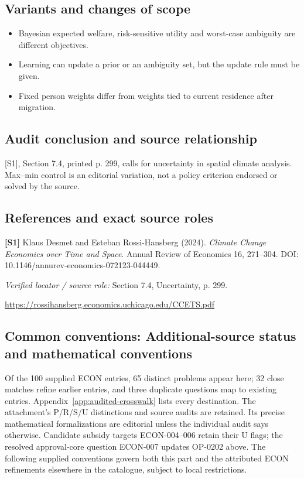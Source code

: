 \documentclass[11pt,a4paper]{article}
\begin{document}
\subsection*{Variants and changes of scope}

\begin{itemize}
\item Bayesian expected welfare, risk-sensitive utility and worst-case ambiguity are different objectives.
\item Learning can update a prior or an ambiguity set, but the update rule must be given.
\item Fixed person weights differ from weights tied to current residence after migration.
\end{itemize}

\subsection*{Audit conclusion and source relationship}

[S1], Section 7.4, printed p. 299, calls for uncertainty in spatial climate analysis. Max--min control is an editorial variation, not a policy criterion endorsed or solved by the source.

\subsection*{References and exact source roles}

{\footnotesize\raggedright
\par\noindent\textbf{[S1]} Klaus Desmet and Esteban Rossi-Hansberg (2024). \emph{Climate Change Economics over Time and Space}. Annual Review of Economics 16, 271–304. DOI: 10.1146/annurev-economics-072123-044449.\par \textit{Verified locator / source role:} Section 7.4, Uncertainty, p. 299.\par \url{https://rossihansberg.economics.uchicago.edu/CCETS.pdf}\par\smallskip
}

\subsection*{Common conventions: Additional-source status and mathematical conventions}

\label{audited:conventions}

Of the 100 supplied ECON entries, 65 distinct problems appear here; 32 close
matches refine earlier entries, and three duplicate questions map to existing
entries. Appendix~\ref{app:audited-crosswalk} lists every destination.
The attachment's P/R/S/U distinctions and source audits are retained. Its
precise mathematical formalizations are editorial unless the individual audit
says otherwise. Candidate subsidy targets ECON-004--006 retain their U flags;
the resolved approval-core question ECON-007 updates OP-0202 above.
The following supplied conventions govern both this part and the attributed
ECON refinements elsewhere in the catalogue, subject to local restrictions.
\end{document}
